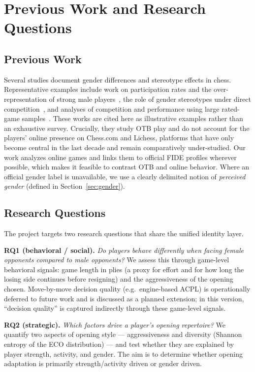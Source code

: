 \documentclass[11pt,a4paper]{article}
\begin{document}
\section{Previous Work and Research Questions}
\subsection{Previous Work}
Several studies document gender differences and stereotype effects in chess. Representative
examples include work on participation rates and the over-representation of strong male
players~\cite{bilalic2009why,blanch2017sex}, the role of gender stereotypes under direct
competition~\cite{maass2008checkmate}, and analyses of competition and performance using
large rated-game samples~\cite{backus2023gender}. These works are cited here as illustrative
examples rather than an exhaustive survey. Crucially, they study OTB play and do not account
for the players' online presence on Chess.com and Lichess, platforms that have only become
central in the last decade and remain comparatively under-studied. Our work analyzes online
games and links them to official FIDE profiles wherever possible, which makes it feasible to
contrast OTB and online behavior. Where an official gender label is unavailable, we use a
clearly delimited notion of \emph{perceived gender} (defined in Section~\ref{sec:gender}).

\subsection{Research Questions}
The project targets two research questions that share the unified identity layer.

\textbf{RQ1 (behavioral / social).} \emph{Do players behave differently when facing female
opponents compared to male opponents?} We assess this through game-level behavioral signals:
game length in plies (a proxy for effort and for how long the losing side continues before
resigning) and the aggressiveness of the opening chosen. Move-by-move decision quality
(e.g.\ engine-based ACPL) is operationally deferred to future work and is discussed as a
planned extension; in this version, ``decision quality'' is captured indirectly through
these game-level signals.

\textbf{RQ2 (strategic).} \emph{Which factors drive a player's opening repertoire?} We
quantify two aspects of opening style --- aggressiveness and diversity (Shannon entropy of the
ECO distribution) --- and test whether they are explained by player strength, activity, and
gender. The aim is to determine whether opening adaptation is primarily strength/activity
driven or gender driven.
\end{document}

